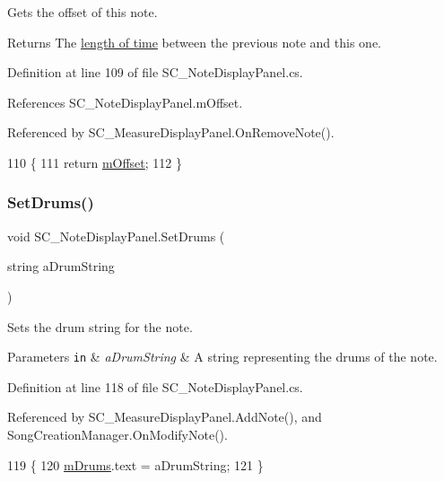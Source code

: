 Gets the offset of this note. 

\begin{DoxyReturn}{Returns}
The \hyperlink{group___music_enums_gaf11b5f079adbb21c800b9eca1c5c3cbd}{length of time} between the previous note and this one. 
\end{DoxyReturn}


Definition at line 109 of file S\+C\+\_\+\+Note\+Display\+Panel.\+cs.



References S\+C\+\_\+\+Note\+Display\+Panel.\+m\+Offset.



Referenced by S\+C\+\_\+\+Measure\+Display\+Panel.\+On\+Remove\+Note().


\begin{DoxyCode}
110     \{
111         \textcolor{keywordflow}{return} \hyperlink{group___s_c___n_d_p_priv_var_ga0a78a2c25da29d944d56d1c8ebb74d03}{mOffset};
112     \}
\end{DoxyCode}
\mbox{\label{group___s_c___n_d_p_unity_gae14b5564be204df7699b95186d83f69f}} 
\subsubsection{\texorpdfstring{Set\+Drums()}{SetDrums()}}
{\footnotesize\ttfamily void S\+C\+\_\+\+Note\+Display\+Panel.\+Set\+Drums (\begin{DoxyParamCaption}\item[{string}]{a\+Drum\+String }\end{DoxyParamCaption})}



Sets the drum string for the note. 


\begin{DoxyParams}[1]{Parameters}
\mbox{\tt in}  & {\em a\+Drum\+String} & A string representing the drums of the note. \\
\hline
\end{DoxyParams}


Definition at line 118 of file S\+C\+\_\+\+Note\+Display\+Panel.\+cs.



Referenced by S\+C\+\_\+\+Measure\+Display\+Panel.\+Add\+Note(), and Song\+Creation\+Manager.\+On\+Modify\+Note().


\begin{DoxyCode}
119     \{
120         \hyperlink{group___s_c___n_d_p_priv_var_gadd38ff2acddedee4b6165f2fc48fd43c}{mDrums}.text = aDrumString;
121     \}
\end{DoxyCode}
\mbox{\label{group___s_c___n_d_p_unity_ga1a1c4b8111463ec3e134d17fe5064a54}} 

